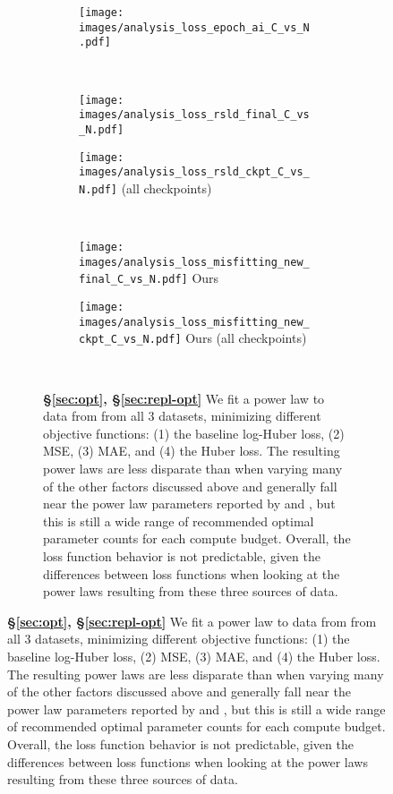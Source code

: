\begin{figure}[]
\ContinuedFloat
\centering 
\begin{subfigure}{\textwidth}
    \centering
\begin{subfigure}{0.49\textwidth}
    \centering
    \texttt{[image: images/analysis\_loss\_epoch\_ai\_C\_vs\_N.pdf]}
    \footnotesize{\citet{hoffmann2022training,besiroglu2024chinchilla}}
\end{subfigure}
\\ \vspace{1em}
\begin{subfigure}{0.49\textwidth}
    \centering
    \texttt{[image: images/analysis\_loss\_rsld\_final\_C\_vs\_N.pdf]}
    \footnotesize{\citet{porian2024resolving}}
\end{subfigure}
\hfill
\begin{subfigure}{0.49\textwidth}
    \centering
    \texttt{[image: images/analysis\_loss\_rsld\_ckpt\_C\_vs\_N.pdf]}
    \footnotesize{\citet{porian2024resolving} (all checkpoints)}
\end{subfigure}
\\ \vspace{1em}
    \centering
\begin{subfigure}{0.49\textwidth}
    \centering
    \texttt{[image: images/analysis\_loss\_misfitting\_new\_final\_C\_vs\_N.pdf]}
    \footnotesize{Ours}
\end{subfigure}
\hfill
\begin{subfigure}{0.49\textwidth}
    \centering
    \texttt{[image: images/analysis\_loss\_misfitting\_new\_ckpt\_C\_vs\_N.pdf]}
    \footnotesize{Ours (all checkpoints)}
\end{subfigure}
\\ \vspace{1em}
\caption{\textbf{\S\ref{sec:opt}, \S\ref{sec:repl-opt}} We fit a power law to data from from all 3 datasets, minimizing different objective functions: (1) the baseline log-Huber loss, (2) MSE, (3) MAE, and (4) the Huber loss. 
The resulting power laws are less disparate than when varying many of the other factors discussed above and generally fall near the power law parameters reported by \citet{kaplan2020scaling} and \citet{hoffmann2022training}, but this is still a wide range of recommended optimal parameter counts for each compute budget. Overall, the loss function behavior is not predictable, given the differences between loss functions when looking at the power laws resulting from these three sources of data.}
\label{fig:analysis_loss_app}
\end{subfigure}
\end{figure}


